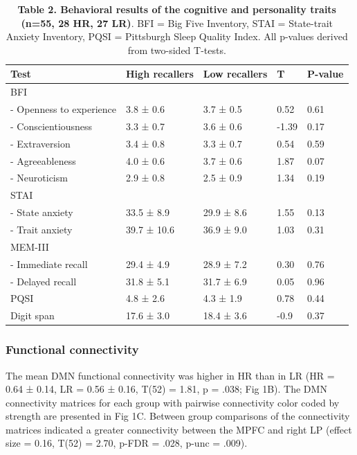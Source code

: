 \begin{table}[htbp]
    \caption*{\textbf{Table 2. Behavioral results of the cognitive and personality traits (n=55, 28 HR, 27 LR)}. BFI = Big Five Inventory, STAI = State-trait Anxiety Inventory, PQSI = Pittsburgh Sleep Quality Index. All p-values derived from two-sided T-tests.}
    \begin{tabularx}{\textwidth}{lXXll}
    \toprule
	Test                     & High recallers & Low recallers & T     & P-value \\ \midrule
	BFI                      &                &               &       &         \\
	- Openness to experience & 3.8 ± 0.6      & 3.7 ± 0.5     & 0.52  & 0.61    \\
	- Conscientiousness      & 3.3 ± 0.7      & 3.6 ± 0.6     & -1.39 & 0.17    \\
	- Extraversion           & 3.4 ± 0.8      & 3.3 ± 0.7     & 0.54  & 0.59    \\
	- Agreeableness          & 4.0 ± 0.6      & 3.7 ± 0.6     & 1.87  & 0.07    \\
	- Neuroticism            & 2.9 ± 0.8      & 2.5 ± 0.9     & 1.34  & 0.19    \\
	STAI                     &                &               &       &         \\
	- State anxiety          & 33.5 ± 8.9     & 29.9 ± 8.6    & 1.55  & 0.13    \\
	- Trait anxiety          & 39.7 ± 10.6    & 36.9 ± 9.0    & 1.03  & 0.31    \\
	MEM-III                  &                &               &       &         \\
	- Immediate recall       & 29.4 ± 4.9     & 28.9 ± 7.2    & 0.30  & 0.76    \\
	- Delayed recall         & 31.8 ± 5.1     & 31.7 ± 6.9    & 0.05  & 0.96    \\
	PQSI                     & 4.8 ± 2.6      & 4.3 ± 1.9     & 0.78  & 0.44    \\
	Digit span               & 17.6 ± 3.0     & 18.4 ± 3.6    & -0.9  & 0.37    \\ \bottomrule
    \end{tabularx}%
\end{table}

\subsubsection*{Functional connectivity}
The mean DMN functional connectivity was higher in HR than in LR (HR = 0.64 ± 0.14, LR = 0.56 ± 0.16, T(52) = 1.81, p = .038; Fig 1B). The DMN connectivity matrices for each group with pairwise connectivity color coded by strength are presented in Fig 1C. Between group comparisons of the connectivity matrices indicated a greater connectivity between the MPFC and right LP (effect size = 0.16, T(52) = 2.70, p-FDR = .028, p-unc = .009).

